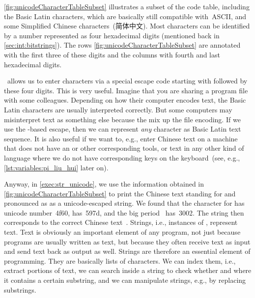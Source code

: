 \cref{fig:unicodeCharacterTableSubset} illustrates a subset of the  code table, including the Basic Latin characters, which are basically still compatible with~ASCII, and some Simplified Chinese characters~(简体中文).
Most  characters can be identified by a number represented as four hexadecimal digits (mentioned back in \cref{sec:int:bitstrings}).
The rows \cref{fig:unicodeCharacterTableSubset} are annotated with the first three of these digits and the columns with fourth and last hexadecimal digits.

\python\ allows us to enter  characters via a special escape code starting with \pythonil{\\u} followed by these four digits.
This is very useful.
Imagine that you are sharing a program file with some colleagues.
Depending on how their computer encodes text, the Basic Latin characters are usually interpreted correctly.
But some computers may misinterpret  text as something else because the mix up the file encoding.
If we use the \pythonil{\\u}-based escape, then we can represent \emph{any} character as Basic Latin text sequence.
It is also useful if we want to, e.g., enter Chinese text on a machine that does not have an  or other corresponding tools, or text in any other kind of language where we do not have corresponding keys on the keyboard~(see, e.g., \cref{lst:variables:pi_liu_hui} later on).

Anyway, in \cref{exec:str_unicode}, we use the information obtained in \cref{fig:unicodeCharacterTableSubset} to print the Chinese text  standing for  and pronounced as  as a unicode-escaped string.
We found that the character for  has unicode number~4f60,  has~597d, and the big period~ has~3002.
The string  then corresponds to the correct Chinese text~.%
\FloatBarrier%
\endhsection%
%
%
Strings, i.e., instances of , represent text.
Text is obviously an important element of any program, not just because programs are usually written as text, but because they often receive text as input and send text back as output as well.
Strings are therefore an essential element of programming.
They are basically lists of characters.
We can index them, i.e., extract portions of text, we can search inside a string to check whether and where it contains a certain substring, and we can manipulate strings, e.g., by replacing substrings.


